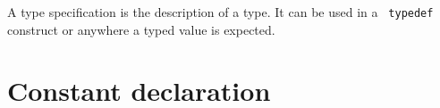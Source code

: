 A type specification is the description of a type. It can be used in a {\tt
typedef} construct or anywhere a typed value is expected.

\smallbreak











\section{Constant declaration}
\label{sec:iff:const}

\smallbreak
